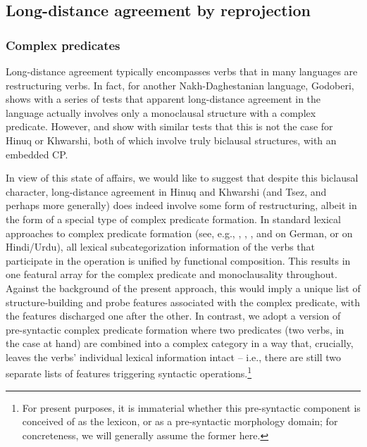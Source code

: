 \documentclass[output=paper
,modfonts
,nonflat]{langsci/langscibook}
\begin{document}
	
	\subsection{Long-distance agreement by reprojection}
	
	\subsubsection{Complex predicates}
	
	Long-distance agreement typically encompasses verbs that in many
	languages are restructuring verbs.  In fact, for another
	Nakh-Daghestanian language, Godoberi, \citet{Haspelmath99} shows with a
	series of tests that apparent long-distance agreement in the language
	actually involves only a monoclausal structure with a complex
	predicate.  However, \citet{Forker:11} and \citet{Khalilova09} show
	with similar tests that this is not the case for Hinuq or Khwarshi,
	both of which involve truly biclausal structures, with an embedded CP.
	
	In view of this state of affairs, we would like to suggest that
	despite this biclausal character, long-distance agreement in Hinuq and
	Khwarshi (and Tsez, and perhaps more generally) does indeed involve
	some form of restructuring, albeit in the form of a special type of
	complex predicate formation. In standard lexical approaches to complex
	predicate formation (see, e.g., \citealt{Haider:93,Haider:10},
	\citealt{Kiss:95}, \citealt{Stiebels:96}, and \citealt{SMueller:02} on
	German, or \citealt{Butt:95} on Hindi/Urdu), all lexical
	subcategorization information of the verbs that participate in the
	operation is unified by functional composition.  This results in one
	featural array for the complex predicate and monoclausality
	throughout. Against the background of the present approach, this would
	imply a unique list of structure-building and probe features
	associated with the complex predicate, with the features discharged
	one after the other. In contrast, we adopt a version of pre-syntactic
	complex predicate formation where two predicates (two verbs, in the
	case at hand) are combined into a complex category in a way that, crucially,
	leaves the verbs' individual lexical information intact -- i.e., there
	are still two separate lists of features triggering syntactic
	operations.\footnote{For present purposes, it is immaterial whether
		this pre-syntactic component is conceived of as the lexicon, or as a
		pre-syntactic morphology domain; for concreteness, we will generally assume
		the former here.}
	
\end{document}
